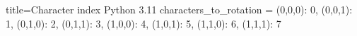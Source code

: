 \documentclass{article}
\begin{document}


\begin{pythoncode}[linenos=true, fontsize=\footnotesize]{title=Character index \hfill Python 3.11}     
characters_to_rotation = {                                                                            
    (0,0,0): 0,                                                                                       
    (0,0,1): 1,                                                                                        
    (0,1,0): 2,
    (0,1,1): 3,
    (1,0,0): 4,
    (1,0,1): 5,
    (1,1,0): 6,
    (1,1,1): 7
}
\end{pythoncode}
\end{document}
